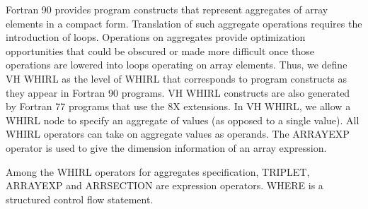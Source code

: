 \documentclass{article}
\begin{document}
Fortran 90 provides program constructs that represent aggregates
of array elements in a compact form. Translation of such aggregate
operations requires the introduction of loops. Operations on
aggregates provide optimization opportunities that could be obscured
or made more difficult once those operations are lowered into loops
operating on array elements. Thus, we define VH WHIRL as the level
of WHIRL that corresponds to program constructs as they appear in
Fortran 90 programs. VH WHIRL constructs are also generated by
Fortran 77 programs that use the 8X extensions. In VH WHIRL, we
allow a WHIRL node to specify an aggregate of values (as opposed
to a single value). All WHIRL operators can take on aggregate values
as operands. The
%
ARRAYEXP operator is used to give the dimension
information of an array expression.

Among the WHIRL operators for aggregates specification,
%
TRIPLET,
%
ARRAYEXP and
%
ARRSECTION are expression operators. WHERE is a
structured control flow statement.
\end{document}
